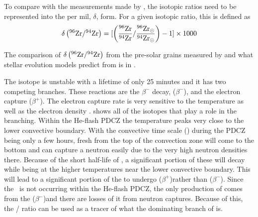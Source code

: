 \documentclass[fleqn,usenatbib]{mnras}
\begin{document}
To compare with the measurements made by \citet{grain}, the isotopic ratios need to be represented into the per mil, $\delta$, form. For a given isotopic ratio, this is defined as
\begin{equation}
\delta\left(\zirconium[96] / \zirconium[94]\right) = [\left(\frac{\zirconium[96]}{\zirconium[94]} / \frac{\zirconium[96]_{\odot}}{\zirconium[94]_{\odot}}\right) - 1]\times 1000
\label{eq:mil}
\end{equation}

\noindent The comparison of $\delta\left(\zirconium[96] / \zirconium[94]\right)$ from the pre-solar grains measured by \citep{grain} and what stellar evolution models predict from \citep{zr} is in .

The \iodine[128] isotope is unstable with a lifetime of only 25 minutes and it has two competing branches. These reactions are the $\beta^{-}$ decay, \iodine[128]($\beta^{-}$)\xenon[128], and the electron capture \iodine[128]($\beta^{+}$)\tellurium[128]. The electron capture rate is very sensitive to the temperature as well as the electron density \citep{reif}.  shows all of the isotopes that play a role in the \iodine[128] branching. Within the He-flash PDCZ the temperature peaks very close to the lower convective boundary. With the convective time scale () during the PDCZ being only a few hours, fresh \iodine[127] from the top of the convection zone will come to the bottom and can capture a neutron easily due to the very high neutron densities there. Because of the short half-life of \iodine[128], a significant portion of these will decay while being at the higher temperatures near the lower convective boundary. This will lead to a significant portion of the \iodine[128] to undergo \iodine[128]($\beta^{+}$)\tellurium[128] rather than \iodine[128]($\beta^{-}$)\xenon[128]. Since the \ppr~is not occurring within the He-flash PDCZ, the only production of \xenon[128] comes from the \iodine[128]($\beta^{-}$)\xenon[128] and there are losses of it from neutron captures. Because of this, the \xenon[128] / \xenon[130] ratio can be used as a tracer of what the dominating branch of \iodine[128] is.
\end{document}

